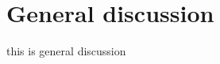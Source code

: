 \chapter*{General discussion}
\label{chap:general_discussion}


\acresetall

this is general discussion